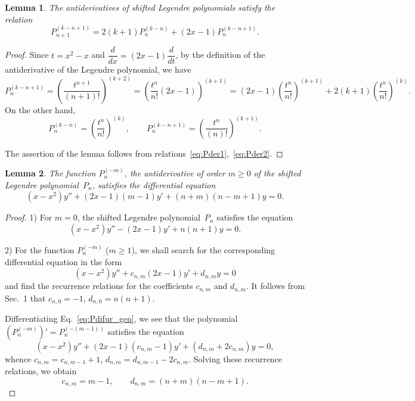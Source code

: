 \documentclass[12pt,oneside]{amsproc}
\numberwithin{equation}{section}
\newtheorem{lem}{Lemma}[section]
\begin{document}
\begin{lem}
 The antiderivatives of shifted Legendre polynomials
satisfy the relation
$$
P_{n+1}^{(k-n+1)}=2(k+1)P_{n}^{(k-n)}+(2x-1) P_{n}^{(k-n+1)}.
$$
\end{lem}

\begin{proof}
 Since
$t=x^2-x$
and
$\dfrac{d}{dx}=(2x-1)\dfrac{d}{dt}$,
by the definition of the antiderivative of the Legendre polynomial,
we have
\begin{equation}
\label{eq:Pder1}
P_{n}^{(k-n+1)}=\left(\dfrac{t^{n+1}}{(n+1)!}\right)^{(k+2)}=\left(\dfrac{t^{n}}{n!}(2x-1)
\right)^{(k+1)}=
(2x-1)\left(\dfrac{t^{n}}{n!}\right)^{(k+1)}+2(k+1)\left(\dfrac{t^{n}}{n!}\right)^{(k)}.
\end{equation}
 On the other hand,
\begin{equation}
\label{eq:Pder2}
P_{n}^{(k-n)}=\left(\dfrac{t^n}{n!}\right)^{(k)},\qquad
P_{n}^{(k-n+1)}=\left(\dfrac{t^{n}}{(n)!}\right)^{(k+1)}.
\end{equation}

 The assertion of the lemma follows from
relations~\eqref{eq:Pder1},~\eqref{eq:Pder2}.
\end{proof}

\begin{lem}
\label{lem:Pdifur}
 The function
$P_n^{(-m)}$,
the antiderivative of order $m\geqslant 0$
of the shifted Legendre polynomial~$P_n$,
satisfies the differential equation
\begin{equation}
\label{eq:Pdifur}
(x-x^2)y''+(2x-1)(m-1)y'+(n+m)(n-m+1)y=0.
\end{equation}
\end{lem}

\begin{proof}
1)
 For
$m=0$,
the shifted Legendre polynomial~$P_n$
satisfies the equation
$$
(x-x^2)y''-(2x-1)y'+n(n+1)y=0.
$$

2)
 For the function
$P_n^{(-m)}$
($m\geqslant 1$),
we shall search for the corresponding differential equation
in the form
\begin{equation}
\label{eq:Pdifur_gen}
(x-x^2)y''+c_{n,m}(2x-1)y'+d_{n,m}y=0
\end{equation}
and find the recurrence relations
for the coefficients
$c_{n,m}$
and
$d_{n,m}$.
 It follows from Sec.~1 that
$c_{n,0}=-1$, $d_{n,0}=n(n+1)$.

 Differentiating Eq.~\eqref{eq:Pdifur_gen},
we see that the polynomial
$(P_n^{(-m)})'=P_n^{(-(m-1))}$
satisfies the equation
$$
(x-x^2)y''+(2x-1)(c_{n,m}-1)y'+(d_{n,m}+2c_{n,m})y=0,
$$
whence
$c_{n,m}=c_{n,m-1}+1$, $d_{n,m}=d_{n,m-1}-2c_{n,m}$.
 Solving these recurrence relations,
we obtain
$$
c_{n,m}=m-1,\qquad d_{n,m}=(n+m)(n-m+1).
$$
\end{proof}
\end{document}
